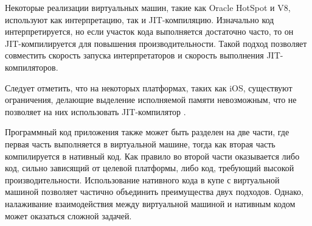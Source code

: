 Некоторые реализации виртуальных машин, такие как Oracle HotSpot и V8, используют как интерпретацию, так и JIT-компиляцию. 
Изначально код интерпретируется, но если участок кода выполняется достаточно часто, то он JIT-компилируется для повышения производительности. 
Такой подход позволяет совместить скорость запуска интерпретаторов и скорость выполнения JIT-компиляторов.

Следует отметить, что на некоторых платформах, таких как iOS, существуют ограничения, делающие выделение исполняемой памяти невозможным, что не позволяет на них использовать JIT-компилятор \cite{IOSJIT}.

Программный код приложения также может быть разделен на две части, где первая часть выполняется в виртуальной машине, тогда как вторая часть компилируется в нативный код. 
Как правило во второй части оказывается либо код, сильно зависящий от целевой платформы, либо код, требующий высокой производительности.
Использование нативного кода в купе с виртуальной машиной позволяет частично объединить преимущества двух подходов. 
Однако, налаживание взаимодействия между виртуальной машиной и нативным кодом может оказаться сложной задачей.
